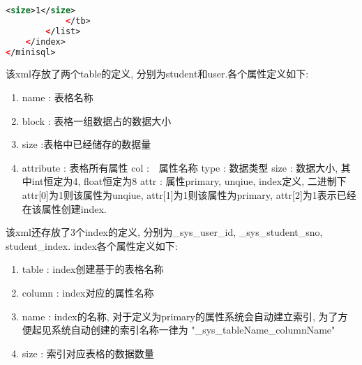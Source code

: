 \documentclass[10pt]{article}
\begin{document}
\begin{CJK}{UTF8}{gkai}
\begin{lstlisting}[language=xml]
                <size>1</size>
            </tb>
        </list>
    </index>
</minisql>
\end{lstlisting}
该xml存放了两个table的定义, 分别为student和user.各个属性定义如下:
\begin{enumerate}
	\item name : 表格名称
	\item block : 表格一组数据占的数据大小
	\item size :表格中已经储存的数据量
	\item attribute : 表格所有属性
		\subitem col :　属性名称
		\subitem type : 数据类型
		\subitem size : 数据大小, 其中int恒定为4, float恒定为8
		\subitem attr : 属性primary, unqiue, index定义, 二进制下attr[0]为1则该属性为unqiue, attr[1]为1则该属性为primary, attr[2]为1表示已经在该属性创建index.
\end{enumerate}
该xml还存放了3个index的定义, 分别为\_sys\_user\_id, \_sys\_student\_sno, student\_index.
index各个属性定义如下:
\begin{enumerate}
	\item table : index创建基于的表格名称
	\item column : index对应的属性名称
	\item name : index的名称, 对于定义为primary的属性系统会自动建立索引, 为了方便起见系统自动创建的索引名称一律为 "\_sys\_tableName\_columnName"
	\item size : 索引对应表格的数据数量
\end{enumerate}

\end{CJK}
\end{document}
